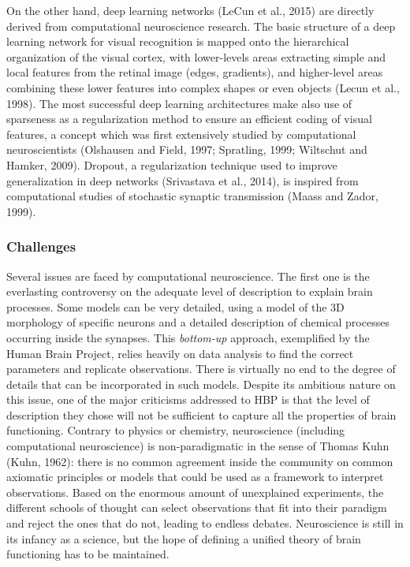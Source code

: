 \documentclass[
  11pt,
  a4paper,
]{scrbook}
\begin{document}
On the other hand, deep learning networks (LeCun et al., 2015) are
directly derived from computational neuroscience research. The basic
structure of a deep learning network for visual recognition is mapped
onto the hierarchical organization of the visual cortex, with
lower-levels areas extracting simple and local features from the retinal
image (edges, gradients), and higher-level areas combining these lower
features into complex shapes or even objects (Lecun et al., 1998). The
most successful deep learning architectures make also use of sparseness
as a regularization method to ensure an efficient coding of visual
features, a concept which was first extensively studied by computational
neuroscientists (Olshausen and Field, 1997; Spratling, 1999; Wiltschut
and Hamker, 2009). Dropout, a regularization technique used to improve
generalization in deep networks (Srivastava et al., 2014), is inspired
from computational studies of stochastic synaptic transmission (Maass
and Zador, 1999).

\subsubsection*{Challenges}\label{challenges}

Several issues are faced by computational neuroscience. The first one is
the everlasting controversy on the adequate level of description to
explain brain processes. Some models can be very detailed, using a model
of the 3D morphology of specific neurons and a detailed description of
chemical processes occurring inside the synapses. This \emph{bottom-up}
approach, exemplified by the Human Brain Project, relies heavily on data
analysis to find the correct parameters and replicate observations.
There is virtually no end to the degree of details that can be
incorporated in such models. Despite its ambitious nature on this issue,
one of the major criticisms addressed to HBP is that the level of
description they chose will not be sufficient to capture all the
properties of brain functioning. Contrary to physics or chemistry,
neuroscience (including computational neuroscience) is non-paradigmatic
in the sense of Thomas Kuhn (Kuhn, 1962): there is no common agreement
inside the community on common axiomatic principles or models that could
be used as a framework to interpret observations. Based on the enormous
amount of unexplained experiments, the different schools of thought can
select observations that fit into their paradigm and reject the ones
that do not, leading to endless debates. Neuroscience is still in its
infancy as a science, but the hope of defining a unified theory of brain
functioning has to be maintained.
\end{document}

